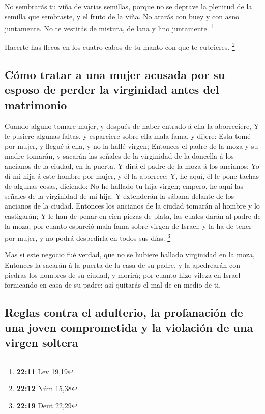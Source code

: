  No sembrarás tu viña de varias semillas, porque no se
deprave la plenitud de la semilla que sembraste, y el fruto de la viña.
 No ararás con buey y con asno juntamente.  No
te vestirás de mistura, de lana y lino juntamente. \footnote{\textbf{22:11}
  Lev 19,19}

 Hacerte has flecos en los cuatro cabos de tu manto con que
te cubrieres. \footnote{\textbf{22:12} Núm 15,38}

\hypertarget{cuxf3mo-tratar-a-una-mujer-acusada-por-su-esposo-de-perder-la-virginidad-antes-del-matrimonio}{%
\subsection{Cómo tratar a una mujer acusada por su esposo de perder la
virginidad antes del
matrimonio}\label{cuxf3mo-tratar-a-una-mujer-acusada-por-su-esposo-de-perder-la-virginidad-antes-del-matrimonio}}

 Cuando alguno tomare mujer, y después de haber entrado á
ella la aborreciere,  Y le pusiere algunas faltas, y
esparciere sobre ella mala fama, y dijere: Esta tomé por mujer, y llegué
á ella, y no la hallé virgen;  Entonces el padre de la moza
y su madre tomarán, y sacarán las señales de la virginidad de la
doncella á los ancianos de la ciudad, en la puerta.  Y dirá
el padre de la moza á los ancianos: Yo dí mi hija á este hombre por
mujer, y él la aborrece;  Y, he aquí, él le pone tachas de
algunas cosas, diciendo: No he hallado tu hija virgen; empero, he aquí
las señales de la virginidad de mi hija. Y extenderán la sábana delante
de los ancianos de la ciudad.  Entonces los ancianos de la
ciudad tomarán al hombre y lo castigarán;  Y le han de
penar en cien piezas de plata, las cuales darán al padre de la moza, por
cuanto esparció mala fama sobre virgen de Israel: y la ha de tener por
mujer, y no podrá despedirla en todos sus días. \footnote{\textbf{22:19}
  Deut 22,29}

 Mas si este negocio fué verdad, que no se hubiere hallado
virginidad en la moza,  Entonces la sacarán á la puerta de
la casa de su padre, y la apedrearán con piedras los hombres de su
ciudad, y morirá; por cuanto hizo vileza en Israel fornicando en casa de
su padre: así quitarás el mal de en medio de ti.

\hypertarget{reglas-contra-el-adulterio-la-profanaciuxf3n-de-una-joven-comprometida-y-la-violaciuxf3n-de-una-virgen-soltera}{%
\subsection{Reglas contra el adulterio, la profanación de una joven
comprometida y la violación de una virgen
soltera}\label{reglas-contra-el-adulterio-la-profanaciuxf3n-de-una-joven-comprometida-y-la-violaciuxf3n-de-una-virgen-soltera}}

